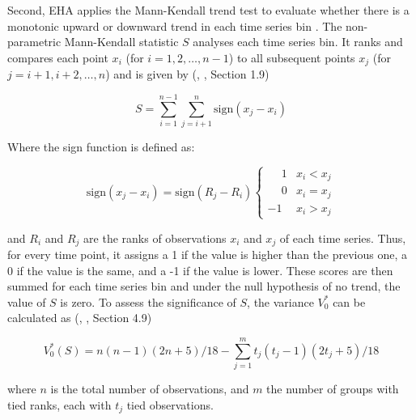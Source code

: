\bigskip

Second, EHA applies the Mann-Kendall trend test to evaluate whether there is a monotonic upward or downward trend in each time series bin \citep{mann1945nonparametric,kendall1990rank}.
The non-parametric Mann-Kendall statistic \(S\) analyses each time series bin. It ranks and compares each point \( x_i \) (for \( i = 1, 2, \ldots, n-1 \)) 
to all subsequent points \( x_j \) (for \( j = i+1, i+2, \ldots, n \)) and is given by (\citeauthor{kendall1990rank}, \citeyear{kendall1990rank}, Section 1.9)

\begin{equation}
S = \sum_{i=1}^{n-1} \sum_{j=i+1}^{n} \text{sign}(x_j - x_i)
\end{equation}

\bigskip

Where the sign function is defined as:

\begin{equation}
\text{sign}(x_j - x_i) = \text{sign}(R_j - R_i)
\begin{cases}
\phantom{-}1 & x_i < x_j \\
\phantom{-}0 & x_i = x_j \\
  -1 & x_i > x_j
\end{cases}
\end{equation}

\bigskip

and \(R_i\) and \(R_j\) are the ranks of observations \(x_i\) and \(x_j\) of each time series.
Thus, for every time point, it assigns a 1 if the value is higher than the previous one, a 0 if the value is the same, and a -1 if the value is lower. These scores are
then summed for each time series bin and under the null hypothesis of no trend, the value of \(S\) is zero. To assess the significance of \(S\), the variance \(V^*_0\)
can be calculated as (\citeauthor{kendall1990rank}, \citeyear{kendall1990rank}, Section 4.9)

\begin{equation}
    V^*_0 (S) = n(n - 1)(2n + 5) / 18 - \sum_{j=1}^{m} t_j(t_j - 1)(2t_j + 5) /18
\end{equation}

\bigskip

where \(n\) is the total number of observations, and \(m\) the number of groups with tied ranks, each with \(t_j\) tied observations. 
